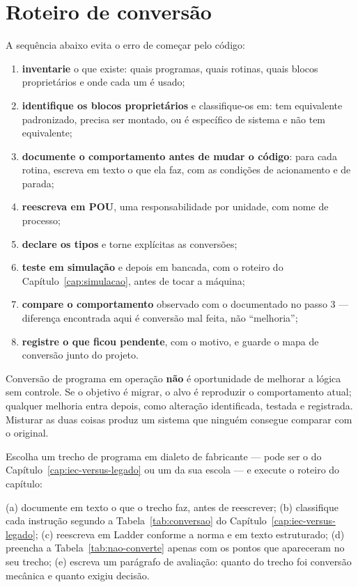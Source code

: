 \section{Roteiro de conversão}

A sequência abaixo evita o erro de começar pelo código:

\begin{enumerate}
  \item \textbf{inventarie} o que existe: quais programas, quais rotinas, quais blocos proprietários e
        onde cada um é usado;
  \item \textbf{identifique os blocos proprietários} e classifique-os em: tem equivalente
        padronizado, precisa ser montado, ou é específico de sistema e não tem equivalente;
  \item \textbf{documente o comportamento antes de mudar o código}: para cada rotina, escreva em texto
        o que ela faz, com as condições de acionamento e de parada;
  \item \textbf{reescreva em POU}, uma responsabilidade por unidade, com nome de processo;
  \item \textbf{declare os tipos} e torne explícitas as conversões;
  \item \textbf{teste em simulação} e depois em bancada, com o roteiro do
        Capítulo~\ref{cap:simulacao}, antes de tocar a máquina;
  \item \textbf{compare o comportamento} observado com o documentado no passo 3 --- diferença
        encontrada aqui é conversão mal feita, não ``melhoria'';
  \item \textbf{registre o que ficou pendente}, com o motivo, e guarde o mapa de conversão junto do
        projeto.
\end{enumerate}

\begin{atencao}
Conversão de programa em operação \textbf{não} é oportunidade de melhorar a lógica sem controle. Se o
objetivo é migrar, o alvo é reproduzir o comportamento atual; qualquer melhoria entra depois, como
alteração identificada, testada e registrada. Misturar as duas coisas produz um sistema que ninguém
consegue comparar com o original.
\end{atencao}

\begin{pratica}
Escolha um trecho de programa em dialeto de fabricante --- pode ser o do Capítulo~\ref{cap:iec-versus-legado}
ou um da sua escola --- e execute o roteiro do capítulo:

(a) documente em texto o que o trecho faz, antes de reescrever;
(b) classifique cada instrução segundo a Tabela~\ref{tab:conversao} do Capítulo~\ref{cap:iec-versus-legado};
(c) reescreva em Ladder conforme a norma e em texto estruturado;
(d) preencha a Tabela~\ref{tab:nao-converte} apenas com os pontos que apareceram no seu trecho;
(e) escreva um parágrafo de avaliação: quanto do trecho foi conversão mecânica e quanto exigiu
decisão.
\end{pratica}

